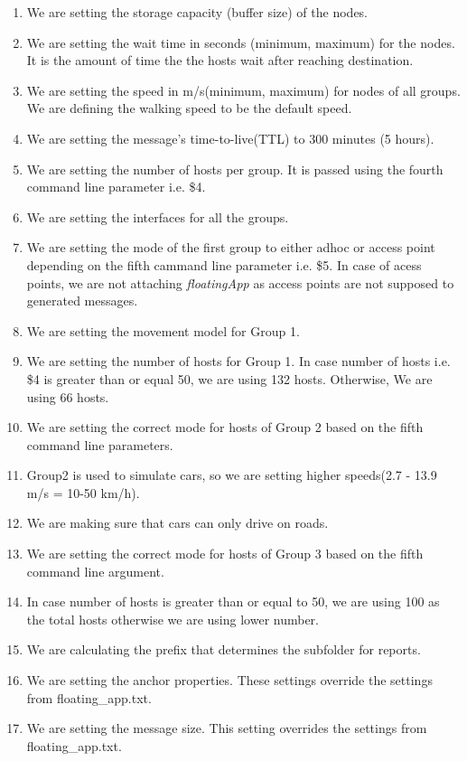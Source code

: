 \begin{enumerate}
  \item We are setting the storage capacity (buffer size) of the nodes.
  \item We are setting the wait time in seconds (minimum, maximum) for the nodes. It is the amount of time the the hosts wait after reaching destination.
  \item We are setting the speed in m/s(minimum, maximum) for nodes of all groups. We are defining the walking speed to be the default speed.
  \item We are setting the message's time-to-live(TTL) to 300 minutes (5 hours).
  \item We are setting the number of hosts per group. It is passed using the fourth command line parameter i.e. \${4}.
  \item We are setting the interfaces for all the groups.
  \item We are setting the mode of the first group to either adhoc or access point depending on the fifth cammand line parameter i.e. \${5}. In case of acess points, we are not attaching \textit{floatingApp} as access points are not supposed to generated messages.
  \item We are setting the movement model for Group 1.
  \item We are setting the number of hosts for Group 1. In case number of hosts i.e. \${4} is greater than or equal 50, we are using 132 hosts. Otherwise, We are using 66 hosts.
  \item We are setting the correct mode for hosts of Group 2 based on the fifth command line parameters.
  \item Group2 is used to simulate cars, so we are setting higher speeds(2.7 - 13.9 m/s = 10-50 km/h).
  \item We are making sure that cars can only drive on roads.
  \item We are setting the correct mode for hosts of Group 3 based on the fifth command line argument.
  \item In case number of hosts is greater than or equal to 50, we are using 100 as the total hosts otherwise we are using lower number.
  \item We are calculating the prefix that determines the subfolder for reports.
  \item We are setting the anchor properties. These settings override the settings from floating\_app.txt.
  \item We are setting the message size. This setting overrides the settings from floating\_app.txt.

\end{enumerate}

